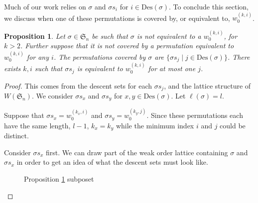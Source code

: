 \documentclass[11pt,reqno]{amsart}
\newtheorem{proposition}[theorem]{Proposition}
\theoremstyle{definition}
\theoremstyle{notation}
\newcommand{\Des}{\text{Des}}
\begin{document}
Much of our work relies on $\sigma$ and $\sigma s_i$ for $i\in \Des(\sigma)$. To conclude this section, we discuss when one of these permutations is covered by, or equivalent to, $w_0^{(k,i)}$.


\begin{proposition}\label{w0andchildren}
Let $\sigma\in \mathfrak{S}_n$ be such that $\sigma$ is not equivalent to a $w_0^{(k,i)}$, for $k>2$. Further suppose that it is not covered by a permutation equivalent to $w_0^{(k,i)}$ for any $i$. The permutations covered by $\sigma$ are $\{\sigma s_j\mid j\in \Des(\sigma) \}$.  
There exists $k,i$ such that $\sigma s_j$ is equivalent to $w_0^{(k,i)}$ for at most one $j$.
\end{proposition}

\begin{proof}
This comes from the descent sets for each $\sigma s_j$, and the lattice structure of $W(\mathfrak{S}_n)$. We consider $\sigma s_x$ and $\sigma s_y$ for $x,y\in \Des(\sigma)$. Let $\ell(\sigma )=l$. 

Suppose that $\sigma s_x = w_0^{(k_x,i)}$ and $\sigma s_y = w_0^{(k_y,j)}$. Since these permutations each have the same length, $l-1$, $k_x=k_y$ while the minimum index $i$ and $j$ could be distinct.  

Consider $\sigma s_x$ first. We can draw part of the weak order lattice containing $\sigma$ and $\sigma s_x$ in order to get an idea of what the descent sets must look like.

\begin{figure}[H]
\begin{center}
\vspace{0.1in}
\caption{Proposition \ref{w0andchildren} subposet}
\label{fig:Weakorder1}
\end{center}
\end{figure}


\end{proof}
\end{document}

